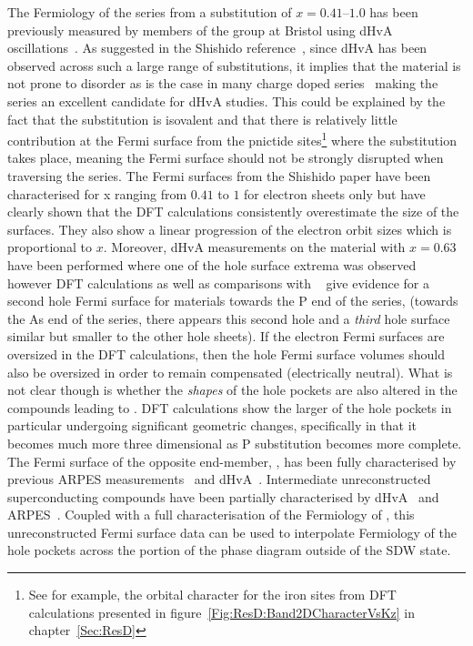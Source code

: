 The Fermiology of the \BaFePAs series from a substitution of $x=0.41$--$1.0$ has been previously measured by members of the group at Bristol using dHvA oscillations~\cite{Shishido2010}. As suggested in the Shishido reference~\cite{Shishido2010}, since dHvA has been observed across such a large range of substitutions, it implies that the material is not prone to disorder as is the case in many charge doped series~\cite{VanderBeek2010} making the series an excellent candidate for dHvA studies. This could be explained by the fact that the substitution is isovalent and that there is relatively little contribution at the Fermi surface from the pnictide sites\footnote{See for example, the orbital character for the iron sites from \ac{DFT} calculations presented in figure~\ref{Fig:ResD:Band2DCharacterVsKz} in chapter~\ref{Sec:ResD}} where the substitution takes place, meaning the Fermi surface should not be strongly disrupted when traversing the series. The Fermi surfaces from the Shishido paper have been characterised for x ranging from $0.41$ to $1$ for electron sheets only but have clearly shown that the DFT calculations consistently overestimate the size of the surfaces. They also show a linear progression of the electron orbit sizes which is proportional to $x$. Moreover, dHvA measurements on the material with $x=0.63$ have been performed where one of the hole surface extrema was observed~\cite{Analytis2010c} however DFT calculations as well as comparisons with \SrFeP~\cite{Analytis2009} give evidence for a second hole Fermi surface for materials towards the P end of the series, (towards the As end of the series, there appears this second hole and a \emph{third} hole surface similar but smaller to the other hole sheets). If the electron Fermi surfaces are oversized in the DFT calculations, then the hole Fermi surface volumes should also be oversized in order to remain compensated (electrically neutral). What is not clear though is whether the \emph{shapes} of the hole pockets are also altered in the compounds leading to \BaFeP. DFT calculations show the larger of the hole pockets in particular undergoing significant geometric changes, specifically in that it becomes much more three dimensional as P substitution becomes more complete. The Fermi surface of the opposite end-member, \BaFeAs, has been fully characterised by previous \ac{ARPES} measurements~\cite{Kondo2010a} and dHvA~\cite{Terashima2011, Analytis2010b}. Intermediate unreconstructed superconducting compounds have been partially characterised by \ac{dHvA}~\cite{Analytis2010c} and \ac{ARPES}~\cite{Yoshida2010}. Coupled with a full characterisation of the Fermiology of \BaFeP, this unreconstructed Fermi surface data can be used to interpolate Fermiology of the hole pockets across the portion of the phase diagram outside of the \ac{SDW} state.

